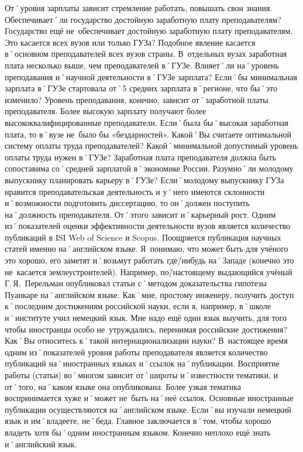 \begin{drama}
	\michaelspeaks От˚уровня зарплаты зависит стремление работать, повышать свои знания.
	\maxspeaks Обеспечивает˚ли государство достойную заработную плату преподавателям? 
	\michaelspeaks Государство ещё не~обеспечивает достойную заработную плату преподавателям. 
	\maxspeaks Это касается всех вузов или только ГУЗа?
	\michaelspeaks Подобное явление касается в˚основном преподавателей всех вузов страны. В~отдельных вузах заработная плата несколько выше, чем преподавателей в˚ГУЗе.
	\maxspeaks Влияет˚ли на˚уровень преподавания и˚научной деятельности в˚ГУЗе зарплата? Если˚бы минимальная зарплата в˚ГУЗе стартовала от˚5 средних зарплата в˚регионе, что бы˚это изменило?
	\michaelspeaks Уровень преподавания, конечно, зависит от˚заработной платы преподавателя. Более высокую зарплату получают более высококвалифицированные преподаватели. Если˚была бы˚высокая заработная плата, то в˚вузе не~было бы «бездарностей».
	\maxspeaks Какой˚Вы считаете оптимальной систему оплаты труда преподавателей? Какой˚минимальной допустимый уровень оплаты труда нужен в˚ГУЗе?
	\michaelspeaks Заработная плата преподавателя должна быть сопоставима со˚средней зарплатой в˚экономике России.
	\maxspeaks Разумно˚ли молодому выпускнику планировать карьеру в˚ГУЗе?
	\michaelspeaks Если˚молодому выпускнику ГУЗа нравится преподавательская деятельность и у˚него имеются склонности и˚возможности подготовить диссертацию, то он˚должен поступить на˚должность преподавателя. От˚этого зависит и˚карьерный рост.
	\maxspeaks Одним из˚показателей оценки эффективности деятельности вузов является количество публикаций в ISI Web of Science и Scopus. Поощряется публикация научных статей именно на˚английском языке. Я~понимаю, что может быть для учёного это хорошо, его заметят и˚возьмут работать где\=/нибудь на˚Западе (конечно это не~касается землеустроителей). Например, по\=/настоящему выдающийся учёный Г.\,Я.~Перельман опубликовал статьи с˚методом доказательства гипотезы Пуанкаре на˚английском языке. Как˚мне, простому инженеру, получить доступ к˚последним достижениям российской науки, если я, например, в˚школе и˚институте учил немецкий язык. Мне надо ещё один язык выучить, для того чтобы иностранцы особо не~утруждались, перенимая российские достижения? Как˚Вы относитесь к˚такой интернационализации науки?
	\michaelspeaks В~настоящее время одним из˚показателей уровня работы преподавателя является количество публикаций на˚иностранных языках и˚ссылок на˚публикации. Восприятие работы (статьи) во˚многом зависит от˚широты и˚известности тематики, и от˚того, на˚каком языке она опубликована. Более узкая тематика воспринимается хуже и˚может не~быть на˚неё ссылок. Основные иностранные публикации осуществляются на˚английском языке. Если˚вы изучали немецкий язык и им˚владеете, не˚беда. Главное заключается в˚том, чтобы хорошо владеть хотя бы˚одним иностранным языком. Конечно неплохо ещё знать и˚английский язык.

\end{drama}
